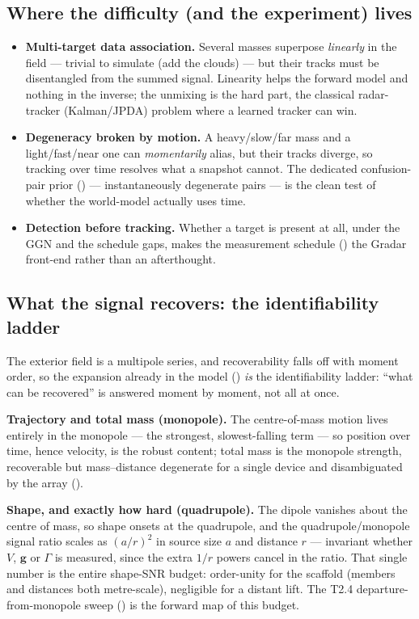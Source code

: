 \documentclass[11pt,a4paper]{article}
\theoremstyle{reqstyle}
\begin{document}
\subsection{Where the difficulty (and the experiment) lives}
\begin{itemize}[leftmargin=*,nosep]
\item \textbf{Multi-target data association.} Several masses superpose \emph{linearly} in the
field --- trivial to simulate (add the clouds) --- but their tracks must be disentangled from
the summed signal. Linearity helps the forward model and nothing in the inverse; the unmixing
is the hard part, the classical radar-tracker (Kalman/JPDA) problem where a learned tracker can
win.
\item \textbf{Degeneracy broken by motion.} A heavy/slow/far mass and a light/fast/near one can
\emph{momentarily} alias, but their tracks diverge, so tracking over time resolves what a
snapshot cannot. The dedicated confusion-pair prior () --- instantaneously
degenerate pairs --- is the clean test of whether the world-model actually uses time.
\item \textbf{Detection before tracking.} Whether a target is present at all, under the GGN and
the schedule gaps, makes the measurement schedule () the Gradar front-end
rather than an afterthought.
\end{itemize}

\subsection{What the signal recovers: the identifiability ladder}
\label{sec:identif}
The exterior field is a multipole series, and recoverability falls off with moment order, so
the expansion already in the model () \emph{is} the identifiability ladder:
``what can be recovered'' is answered moment by moment, not all at once.

\textbf{Trajectory and total mass (monopole).} The centre-of-mass motion lives entirely in the
monopole --- the strongest, slowest-falling term --- so position over time, hence velocity, is
the robust content; total mass is the monopole strength, recoverable but mass--distance
degenerate for a single device and disambiguated by the array ().

\textbf{Shape, and exactly how hard (quadrupole).} The dipole vanishes about the centre of
mass, so shape onsets at the quadrupole, and the quadrupole/monopole signal ratio scales as
$(a/r)^2$ in source size $a$ and distance $r$ --- invariant whether $V$, $\mathbf g$ or
$\Gamma$ is measured, since the extra $1/r$ powers cancel in the ratio. That single number is
the entire shape-SNR budget: order-unity for the scaffold (members and distances both
metre-scale), negligible for a distant lift. The T2.4 departure-from-monopole sweep
() is the forward map of this budget.
\end{document}
